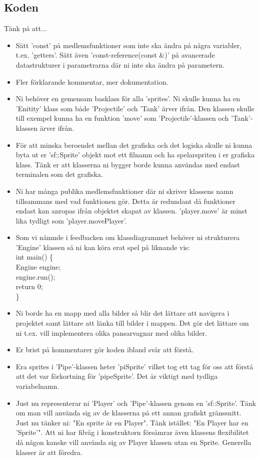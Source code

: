 \documentclass{TDP003mall}
\begin{document}
\newpage

\subsection{Koden}
Tänk på att...
\begin{itemize}
\item Sätt 'const' på medlemsfunktioner som inte ska ändra på några variabler, t.ex. 'getters'. Sätt även 'const-reference(const \&)' på avancerade datastrukturer i parametrarna där ni inte ska ändra på parametern.
\item Fler förklarande kommentar, mer dokumentation.
\item Ni behöver en gemensam basklass för alla 'sprites'. Ni skulle kunna ha en 'Enitity' klass som både 'Projectile' och 'Tank' ärver ifrån. Den klassen skulle till exempel kunna ha en funktion 'move' som 'Projectile'-klassen och 'Tank'-klassen ärver ifrån.
\item För att minska beroendet mellan det grafiska och det logiska skulle ni kunna byta ut er 'sf::Sprite' objekt mot ett filnamn och ha spelarspriten i er grafiska klass. Tänk er att klasserna ni bygger borde kunna användas med endast terminalen som det grafiska.
\item Ni har många publika medlemsfunktioner där ni skriver klassens namn tillsammans med vad funktionen gör. Detta är redundant då funktioner endast kan anropas ifrån objektet skapat av klassen. 'player.move' är minst lika tydligt som 'player.movePlayer'.
\item Som vi nämnde i feedbacken om klassdiagrammet behöver ni strukturera 'Engine' klassen så ni kan köra erat spel på liknande vis: \\
	int main()	\{\\
		Engine engine;\\
		engine.run();\\
		return 0;\\
	\}
\item Ni borde ha en mapp med alla bilder så blir det lättare att navigera i projektet samt lättare att länka till bilder i mappen. Det gör det lättare om ni t.ex. vill implementera olika pansarvagnar med olika bilder.
\item Er brist på kommentarer gör koden ibland svår att förstå.
\item Era sprites i 'Pipe'-klassen heter 'piSprite' vilket tog ett tag för oss att förstå att det var förkortning för 'pipeSprite'. Det är viktigt med tydliga variabelnamn.
\item Just nu representerar ni 'Player' och 'Pipe'-klassen genom en 'sf::Sprite'. Tänk om man vill använda sig av de klasserna på ett annan grafiskt gränssnitt. Just nu tänker ni: "En sprite är en Player". Tänk istället: "En Player har en 'Sprite'". Att ni har filväg i konstruktorn försämrar även klassens flexibilitet då någon kanske vill använda sig av Player klassen utan en Sprite. Generella klasser är att föredra.

\end{itemize}
\end{document}
